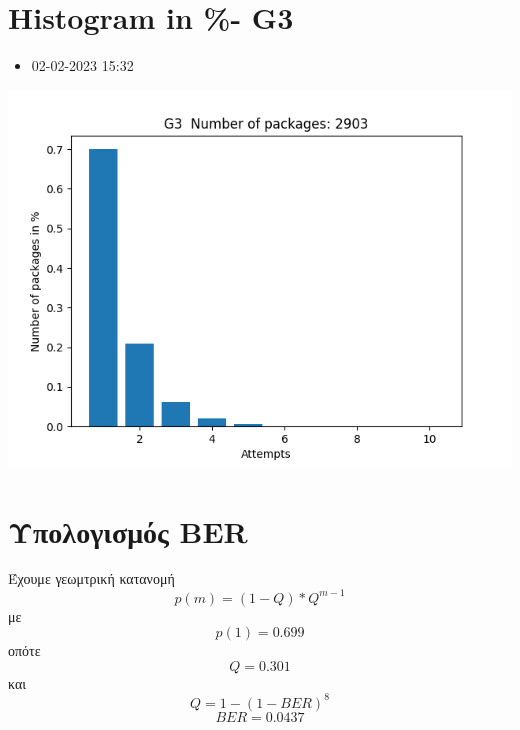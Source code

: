 \documentclass[10pt,a4paper]{article}
\begin{document}
\section*{\textlatin{Histogram in \%- G3}}
\begin{itemize}
  \item 02-02-2023 15:32
\end{itemize}
\begin{center}
  \includegraphics[scale=0.8]{G4.png}
  \newline
  \newline
  \newline
  \newline
\end{center}

\section*{Υπολογισμός \textlatin{BER}}
Έχουμε γεωμτρική κατανομή
\[p(m) = (1-Q)*Q^{m-1}\]
με
\[p(1) = 0.699\]
οπότε
\[Q = 0.301 \]
και
\[Q = 1 - (1 - BER)^8\]
\[BER = 0.0437 \]
\end{document}
